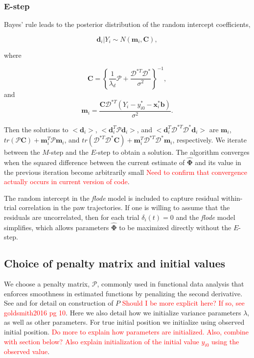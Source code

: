 \documentclass[preprint]{JASA}
\begin{document}
\hypertarget{e-step}{%
\subsubsection{E-step}\label{e-step}}

Bayes' rule leads to the posterior distribution of the random intercept
coefficients,

\[\mathbf{d}_i | Y_i \sim N\left(\mathbf{m}_i , \mathbf{C}\right),\]

\noindent where

\[\mathbf{C} = \left\{\frac{1}{\lambda_d}\mathcal{P} + \frac{\mathcal{D}^{*T}\mathcal{D}^*}{\sigma^2}\right\}^{-1},\]
\noindent and
\[\mathbf{m}_i = \frac{\mathbf{C} \mathcal{D}^{*T}\left(Y_i - y_{i0}^* -  \mathbf{x}_i^*\mathbf{b}\right)}{\sigma^2}.\]

\noindent Then the solutions to \(<\mathbf{d}_i>\),
\(<\mathbf{d}_i^T\mathcal{P}\mathbf{d}_i>\), and
\(<\mathbf{d}_i^T\mathcal{D}^{*T}\mathcal{D}^*\mathbf{d}_i>\) are
\(\mathbf{m}_i\),
\(tr(\mathcal{P}\mathbf{C}) + \mathbf{m}_i^T\mathcal{P}\mathbf{m}_i\),
and
\(tr( \mathcal{D}^{*T}\mathcal{D}^*\mathbf{C}) + \mathbf{m}_i^T\mathcal{D}^{*T}\mathcal{D}^*\mathbf{m}_i\),
respectively. We iterate between the \(M\)-step and the \(E\)-step to
obtain a solution. The algorithm converges when the squared difference
between the current estimate of \(\widehat{\mathbf{\Phi}}\) and its
value in the previous iteration become arbitrarily small
\textcolor{red}{Need to confirm that convergence actually occurs in current version of code}.

The random intercept in the \emph{flode} model is included to capture
residual within-trial correlation in the paw trajectories. If one is
willing to assume that the residuals are uncorrelated, then for each
trial \(\delta_i(t) = 0\) and the \emph{flode} model simplifies, which
allows parameters \(\widehat{\mathbf{\Phi}}\) to be maximized directly
without the \(E\)-step.

\hypertarget{choice-of-penalty-matrix-and-initial-values}{%
\subsection{Choice of penalty matrix and initial
values}\label{choice-of-penalty-matrix-and-initial-values}}

We choose a penalty matrix, \(\mathcal{P}\), commonly used in functional
data analysis that enforces smoothness in estimated functions by
penalizing the second derivative. See \cite{eilers1996} and
\cite{goldsmith2016} for detail on construction of \(P\)
\textcolor{red}{Should I be more explicit here? If so, see goldsmith2016 pg 10}.
Here we also detail how we initialize variance parameters \(\lambda\),
as well as other parameters. For true initial position we initialize
using observed initial position.
\textcolor{red}{Do more to explain how parameters are initialized. Also, combine with section below? Also explain initialization of the initial value $y_{i0}$ using the observed value}.
\end{document}
